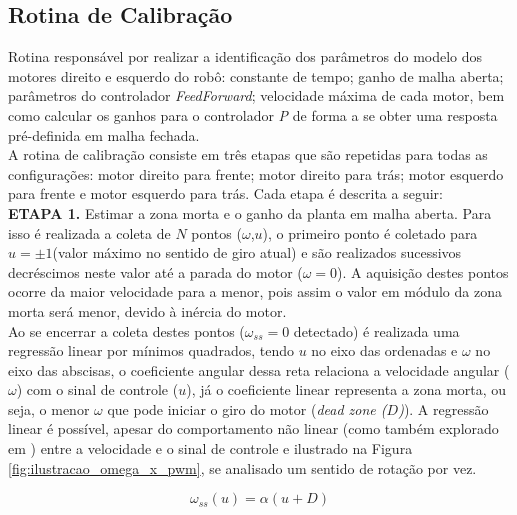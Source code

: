 \subsection{Rotina de Calibração}
\label{subsec:rotina_calibracao}

Rotina responsável por realizar a identificação dos parâmetros do modelo dos motores direito e esquerdo do robô: constante de tempo; ganho de malha aberta; parâmetros do controlador \emph{FeedForward}; velocidade máxima de cada motor, bem como calcular os ganhos para o controlador \emph{P} de forma a se obter uma resposta pré-definida em malha fechada.\\

A rotina de calibração consiste em três etapas que são repetidas para todas as configurações: motor direito para frente; motor direito para trás; motor esquerdo para frente e motor esquerdo para trás. Cada etapa é descrita a seguir: \\


\textbf{ETAPA 1.} Estimar a zona morta e o ganho da planta em malha aberta. Para isso é realizada a coleta de $N$ pontos ($\omega$,$u$), o primeiro ponto é coletado para $u = \pm1$(valor máximo no sentido de giro atual) e são realizados sucessivos decréscimos neste valor até a parada do motor ($\omega = 0$). A aquisição destes pontos ocorre da maior velocidade para a menor, pois assim o valor em módulo da zona morta será menor, devido à inércia do motor.\\

Ao se encerrar a coleta destes pontos ($\omega_{ss} = 0$ detectado) é realizada uma regressão linear por mínimos quadrados, tendo $u$ no eixo das ordenadas e $\omega$ no eixo das abscisas, o coeficiente angular dessa reta relaciona a velocidade angular ($\omega$) com o sinal de controle ($u$), já o coeficiente linear representa a zona morta, ou seja, o menor $\omega$ que pode iniciar o giro do motor (\emph{dead zone ($D$)}). A regressão linear é possível, apesar do comportamento não linear (como também explorado em \cite{dead_zone}) entre a velocidade e o sinal de controle e ilustrado na Figura \ref{fig:ilustracao_omega_x_pwm}, se analisado um sentido de rotação por vez.

\begin{equation}
    \omega_{ss}(u) = \alpha(u + D)
    \label{eq:omega_x_sinal_de_controle}
\end{equation}

